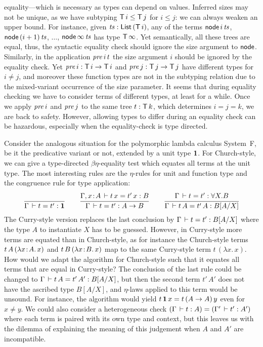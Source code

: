 \documentclass[acmlarge,review,anonymous]{acmart}\settopmatter{printfolios=true}
\begin{document}
equality---which is necessary as types can depend on values.  Inferred
sizes may not be unique, as we have subtyping $\mathsf{T}\,i \leq \mathsf{T}\,j$ for
$i \leq j$: we can always weaken an upper bound.  For instance, given
$\mathit{ts} : \mathsf{List}\,(\mathsf{T}\,i)$, any of the terms
$\mathsf{node}\,i\,\mathit{ts}$, $\mathsf{node}\,(i+1)\,\mathit{ts}$, $\dots$, $\mathsf{node}\,\infty\,\mathit{ts}$
has type
$\mathsf{T}\,\infty$.  Yet semantically, all these trees are equal,
thus, the syntactic equality check should ignore the size argument to
$\mathsf{node}$.  Similarly, in the application $\mathit{pre}\,i\,t$ the size
argument $i$ should be ignored by the equality check.  Yet
$\mathit{pre}\,i : \mathsf{T}\,i \to \mathsf{T}\,i$ and $\mathit{pre}\,j : \mathsf{T}\,j \to \mathsf{T}\,j$ have
different types for $i \not= j$, and moreover these function types are
not in the subtyping relation due to the mixed-variant occurrence of the
size parameter.  It seems that during equality checking we have to
consider terms of different types, at least for a while.  Once we apply
$\mathit{pre}\,i$ and $\mathit{pre}\,j$ to the same tree $t : \mathsf{T}\,k$, which
determines $i = j = k$, we are back to safety.  However, allowing
types to differ during an equality check can be hazardous, especially
when the equality-check is type directed.

Consider the analogous situation for the polymorphic lambda calculus System~F, be it the predicative variant or not, extended by a unit type $\mathbf{1}$.
For Church-style, we can give a type-directed $\beta\eta$-equality test which equates all terms at the unit type.  The most interesting rules are the $\eta$-rules for unit and function type and the congruence rule for type application:
\begin{gather*}
\renewcommand{\jchk}{:}
\renewcommand{\jinf}{:}
  \ru{}{\Gamma \der t = t' \jchk \One}
\qquad
  \ru{\Gamma, x \of A \der t\,x = t'\,x \jchk B
    }{\Gamma \der t = t' \jchk A \to B}
\qquad
  \ru{\Gamma \der t = t' \jinf \forall X. B
    }{\Gamma \der t\,A = t'\,A \jinf B[A/X]}
\end{gather*}
The Curry-style version replaces the last conclusion by $\Gamma \,\vdash t = t' : B[A/X]$ where the type $A$ to instantiate $X$ has to be guessed.  However, in Curry-style more terms are equated than in Church-style, as for instance the Church-style terms $t\,A\,(\lambda x \!:\! A.\, x)$ and $t\,B\,(\lambda x \!:\! B.\, x)$ map to the same Curry-style term $t\,(\lambda x.\,x)$.  How would we adapt the algorithm for Church-style such that it equates all terms that are equal in Curry-style?  The conclusion of the last rule could be changed to $\Gamma \,\vdash t\,A = t'\,A' : B[A/X]$, but then the second term $t'\,A'$ does not have the ascribed type $B[A/X]$, and $\eta$-laws applied to this term would be unsound.  For instance, the algorithm would yield $t\,\mathbf{1}\,x = t\,(A \to A)\,y$ even for $x \not= y$.
We could also consider a heterogeneous check $(\Gamma \,\vdash t : A) = (\Gamma' \,\vdash t' : A')$ where each term is paired with its own type and context, but this leaves us with the dilemma of explaining the meaning of this judgement when $A$ and $A'$ are incompatible.
\end{document}

